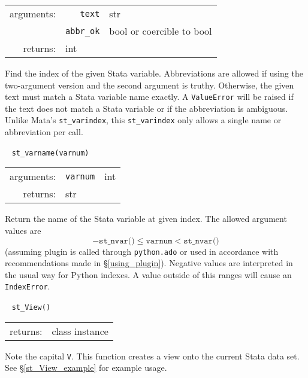 \documentclass{article}
\begin{document}
			\indent \qquad \begin{tabular}{rrl}
					arguments: & \texttt{text} & str \\
					  & \texttt{abbr\_ok} & bool or coercible to bool \\
					returns: & \multicolumn{2}{l}{int}
				\end{tabular}
								
			\vspace{1.5mm}
			\noindent Find the index of the given Stata variable. Abbreviations are allowed if using the two-argument version and the second argument is truthy. Otherwise, the given text must match a Stata variable name exactly. A \lstinline$ValueError$ will be raised if the text does not match a Stata variable or if the abbreviation is ambiguous. Unlike Mata's \lstinline{st_varindex}, this \lstinline{st_varindex} only allows a single name or abbreviation per call. \newline
			
			
			\ \newline
			\noindent \lstinline$st_varname(varnum)$
								
			\vspace{1.5mm}
			\noindent 
			\indent \begin{tabular}{rrl}
					arguments: & \texttt{varnum} & int \\
					returns: & \multicolumn{2}{l}{str}
				\end{tabular}
								
			\vspace{1.5mm}
			\noindent Return the name of the Stata variable at given index. The allowed argument values are
			\[
				-\texttt{st\_nvar()} \leq \texttt{varnum} < \texttt{st\_nvar()}
			\]
			(assuming plugin is called through \lstinline$python.ado$ or used in accordance with recommendations made in \S\ref{using_plugin}). Negative values are interpreted in the usual way for Python indexes. A value outside of this ranges will cause an \lstinline$IndexError$. \newline
			
			
			\ \newline
			\noindent \lstinline$st_View()$
								
			\vspace{1.5mm}
			\noindent 
			\indent \begin{tabular}{rrl}
					returns: & \multicolumn{2}{l}{class instance}
				\end{tabular}
								
			\vspace{1.5mm}
			\noindent Note the capital \lstinline{V}. This function creates a view onto the current Stata data set. See \S\ref{st_View_example} for example usage. \newline
			
\end{document}

